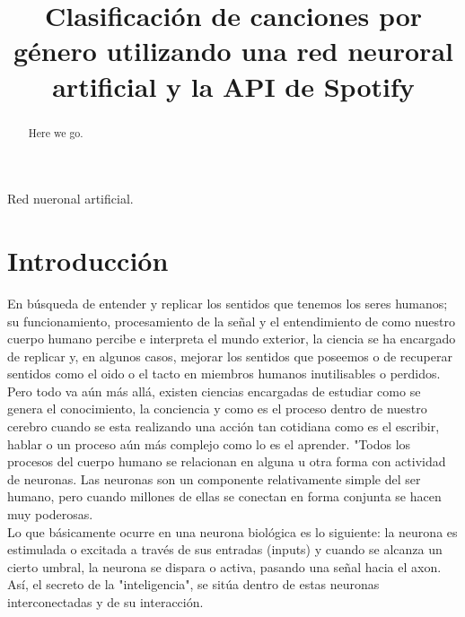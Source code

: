 \documentclass[conference]{IEEEtran}
\begin{document}
\title{  Clasificación de canciones por género utilizando una red neuroral artificial y la API de Spotify }
\author{

\and
{}
}

\maketitle
\renewcommand\abstractname{Abstract}
\begin{abstract}
Here we go. \\
\end{abstract}



\begin{IEEEkeywords}
Red nueronal artificial.
\end{IEEEkeywords}

\tableofcontents

\IEEEpeerreviewmaketitle
\section{Introducción}
En búsqueda  de entender y replicar los sentidos que tenemos los seres humanos; su funcionamiento, procesamiento de la señal y el entendimiento de como nuestro cuerpo humano percibe e interpreta el mundo exterior, la ciencia se ha encargado de replicar y, en algunos casos, mejorar los sentidos que poseemos o de recuperar sentidos como el oido o el tacto en miembros humanos inutilisables o perdidos. Pero todo va aún más allá, existen ciencias encargadas de estudiar como se genera el conocimiento, la conciencia y como es el proceso dentro de nuestro cerebro cuando se esta realizando una acción tan cotidiana como es el escribir, hablar o un proceso aún más complejo como lo es el aprender. "Todos los procesos del cuerpo humano se relacionan en alguna u otra forma con actividad de neuronas. Las neuronas son un componente relativamente simple del ser humano, pero cuando millones de ellas se conectan en forma conjunta se hacen muy poderosas. \\
Lo que básicamente ocurre en una neurona biológica es lo siguiente: la neurona es estimulada o excitada a través de sus entradas (inputs) y cuando se alcanza un cierto umbral, la neurona se dispara o activa, pasando una señal hacia el axon. Así, el secreto de la "inteligencia", se sitúa dentro de estas neuronas interconectadas y de su interacción.\\
\end{document}
